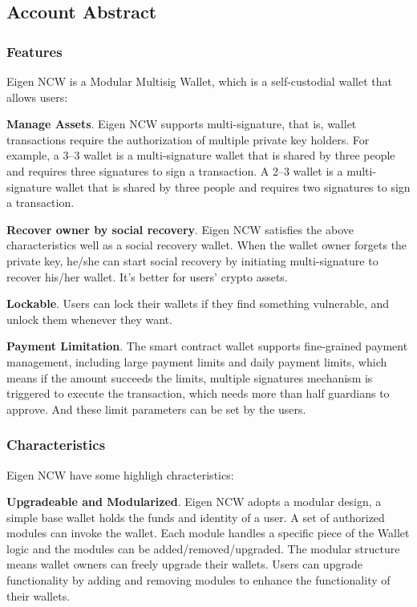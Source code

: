 \subsection{Account Abstract}

\subsubsection{Features}

Eigen NCW is a Modular Multisig Wallet, which is a self-custodial wallet that allows users:
\newline

\textbf{Manage Assets}. Eigen NCW supports multi-signature, that is, wallet transactions require the authorization of multiple private key holders. For example, a 3–3 wallet is a multi-signature wallet that is shared by three people and requires three signatures to sign a transaction. A 2–3 wallet is a multi-signature wallet that is shared by three people and requires two signatures to sign a transaction.
\newline

\textbf{Recover owner by social recovery}. Eigen NCW satisfies the above characteristics well as a social recovery wallet. When the wallet owner forgets the private key, he/she can start social recovery by initiating multi-signature to recover his/her wallet. It's better for users' crypto assets.
\newline

\textbf{Lockable}. Users can lock their wallets if they find something vulnerable, and unlock them whenever they want.
\newline

\textbf{Payment Limitation}. The smart contract wallet supports fine-grained payment management, including large payment limits and daily payment limits, which means if the amount succeeds the limits, multiple signatures mechanism is triggered to execute the transaction, which needs more than half guardians to approve. And these limit parameters can be set by the users.

\subsubsection{Characteristics}

Eigen NCW have some highligh chracteristics:
\newline

\textbf{Upgradeable and Modularized}. Eigen NCW adopts a modular design, a simple base wallet holds the funds and identity of a user. A set of authorized modules can invoke the wallet. Each module handles a specific piece of the Wallet logic and the modules can be added/removed/upgraded. The modular structure means wallet owners can freely upgrade their wallets. Users can upgrade functionality by adding and removing modules to enhance the functionality of their wallets.
\newline

